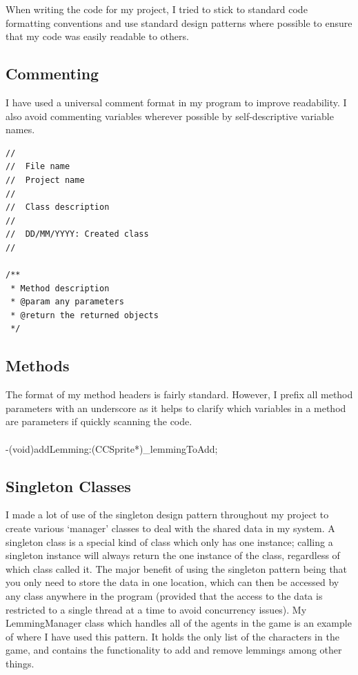 \documentclass[a4paper,oneside]{report}
\begin{document}
When writing the code for my project, I tried to stick to standard code formatting conventions and use standard design patterns where possible to ensure that my code was easily readable to others. 

\subsection{Commenting}

I have used a universal comment format in my program to improve readability. I also avoid commenting variables wherever possible by self-descriptive variable names.

\begin{lstlisting}[label=some-code,caption=Comment Formatting]
//
//  File name
//  Project name
//
//  Class description
//
//  DD/MM/YYYY: Created class
//

/**
 * Method description
 * @param any parameters
 * @return the returned objects
 */
 \end{lstlisting}

\subsection{Methods}

The format of my method headers is fairly standard. However, I prefix all method parameters with an underscore as it helps to clarify which variables in a method are parameters if quickly scanning the code.

\paragraph{}-(void)addLemming:(CCSprite*)\_lemmingToAdd;


\subsection{Singleton Classes} 

I made a lot of use of the singleton design pattern throughout my project to create various `manager' classes to deal with the shared data in my system. A singleton class is a special kind of class which only has one instance; calling a singleton instance will always return the one instance of the class, regardless of which class called it. The major benefit of using the singleton pattern being that you only need to store the data in one location, which can then be accessed by any class anywhere in the program (provided that the access to the data is restricted to a single thread at a time to avoid concurrency issues). My LemmingManager class which handles all of the agents in the game is an example of where I have used this pattern. It holds the only list of the characters in the game, and contains the functionality to add and remove lemmings among other things.
\end{document}
